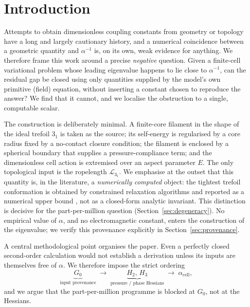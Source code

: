 \documentclass[11pt,a4paper]{article}
\theoremstyle{definition}
\begin{document}
\section{Introduction}
\label{sec:intro}

Attempts to obtain dimensionless coupling constants from geometry or topology
have a long and largely cautionary history, and a numerical coincidence between a
geometric quantity and $\alpha^{-1}$ is, on its own, weak evidence for anything.
We therefore frame this work around a precise \emph{negative} question. Given a
finite-cell variational problem whose leading eigenvalue happens to lie close to
$\alpha^{-1}$, can the residual gap be closed using only quantities supplied by
the model's own primitive (field) equation, without inserting a constant chosen
to reproduce the answer? We find that it cannot, and we localise the obstruction
to a single, computable scalar.

The construction is deliberately minimal. A finite-core filament in the shape of
the ideal trefoil $3_1$ is taken as the source; its self-energy is regularised by
a core radius fixed by a no-contact closure condition; the filament is enclosed by
a spherical boundary that supplies a pressure-compliance term; and the
dimensionless cell action is extremised over an aspect parameter $E$. The only
topological input is the ropelength $\mathcal{L}_{3_1}$. We emphasise at the outset
that this quantity is, in the literature, a \emph{numerically computed} object: the
tightest trefoil conformation is obtained by constrained relaxation algorithms
\cite{PieranskiPrzybyl2001IdealTrefoil,PrzybylPieranski2014HighResolutionTrefoil}
and reported as a numerical upper bound
\cite{BaranskaPieranskiRawdon2004RopelengthPolygonal,AshtonCantarellaPiatekRawdon2005SelfContact},
not as a closed-form analytic invariant. This distinction is decisive for the
part-per-million question (Section~\ref{sec:degeneracy}). No empirical value of
$\alpha$, and no electromagnetic constant, enters the construction of the
eigenvalue; we verify this provenance explicitly in
Section~\ref{sec:provenance}.

A central methodological point organises the paper. Even a perfectly closed
second-order calculation would not establish a derivation unless its inputs are
themselves free of $\alpha$. We therefore impose the strict ordering
\begin{equation}
  \underbrace{G_0}_{\text{input provenance}}
  \;\longrightarrow\;
  \underbrace{H_2,\,H_3}_{\text{pressure / phase Hessians}}
  \;\longrightarrow\;
  \alpha_{\mathrm{cell}},
  \label{eq:ordering}
\end{equation}
and we argue that the part-per-million programme is blocked at $G_0$, not at the
Hessians.
\end{document}
